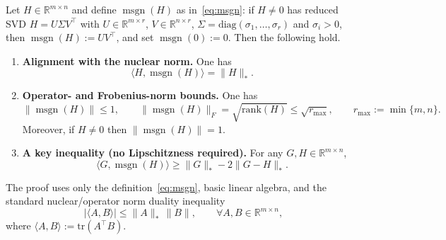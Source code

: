 \documentclass[10pt,a4paper]{amsart}
\begin{document}
\begin{lemma}
\label{lem:sudamuon-msgn-basic}
Let $H\in\mathbb{R}^{m\times n}$ and define $\operatorname{msgn}(H)$ as in~\eqref{eq:msgn}: if $H\neq 0$ has reduced SVD $H=U\Sigma V^{\top}$ with $U\in\mathbb{R}^{m\times r}$, $V\in\mathbb{R}^{n\times r}$, $\Sigma=\mathrm{diag}(\sigma_1,\dots,\sigma_r)$ and $\sigma_i>0$, then $\operatorname{msgn}(H):=UV^{\top}$, and set $\operatorname{msgn}(0):=0$.
Then the following hold.
\begin{enumerate}
\item \textbf{Alignment with the nuclear norm.} One has
\begin{equation}
\langle H,\operatorname{msgn}(H)\rangle = \|H\|_*.
\end{equation}
\item \textbf{Operator- and Frobenius-norm bounds.} One has
\begin{equation}
\|\operatorname{msgn}(H)\|\le 1,\qquad \|\operatorname{msgn}(H)\|_F = \sqrt{\mathrm{rank}(H)}\le \sqrt{r_{\max}},\qquad r_{\max}:=\min\{m,n\}.
\end{equation}
Moreover, if $H\neq 0$ then $\|\operatorname{msgn}(H)\|=1$.
\item \textbf{A key inequality (no Lipschitzness required).} For any $G,H\in\mathbb{R}^{m\times n}$,
\begin{equation}
\label{eq:msgn-robust-ip-lb}
\langle G,\operatorname{msgn}(H)\rangle \ge \|G\|_* - 2\|G-H\|_*.
\end{equation}
\end{enumerate}
The proof uses only the definition~\eqref{eq:msgn}, basic linear algebra, and the standard nuclear/operator norm duality inequality
\begin{equation}
\label{eq:nuc-op-duality}
|\langle A,B\rangle| \le \|A\|_*\,\|B\|,\qquad \forall A,B\in\mathbb{R}^{m\times n},
\end{equation}
where $\langle A,B\rangle:=\mathrm{tr}(A^{\top}B)$.
\end{lemma}
\end{document}

